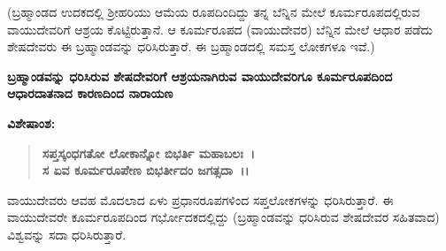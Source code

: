 (ಬ್ರಹ್ಮಾಂಡದ ಉದಕದಲ್ಲಿ ಶ‍್ರೀಹರಿಯು ಆಮೆಯ ರೂಪದಿಂದಿದ್ದು ತನ್ನ ಬೆನ್ನಿನ ಮೇಲೆ ಕೂರ್ಮರೂಪದಲ್ಲಿರುವ ವಾಯುದೇವರಿಗೆ ಆಶ್ರಯ ಕೊಟ್ಟಿರುತ್ತಾನೆ. ಆ ಕೂರ್ಮರೂಪದ (ವಾಯುದೇವರ) ಬೆನ್ನಿನ ಮೇಲೆ ಆಧಾರ ಪಡೆದು ಶೇಷದೇವರು ಈ ಬ್ರಹ್ಮಾಂಡವನ್ನು ಧರಿಸಿರುತ್ತಾರೆ. ಈ ಬ್ರಹ್ಮಾಂಡದಲ್ಲಿ ಸಮಸ್ತ ಲೋಕಗಳೂ ಇವೆ.)

\begin{center}
\textbf{ಬ್ರಹ್ಮಾಂಡವನ್ನು ಧರಿಸಿರುವ ಶೇಷದೇವರಿಗೆ ಆಶ್ರಯನಾಗಿರುವ ವಾಯುದೇವರಿಗೂ ಕೂರ್ಮರೂಪದಿಂದ ಆಧಾರದಾತನಾದ ಕಾರಣದಿಂದ ನಾರಾಯಣ}
\end{center}

\noindent
\textbf{ವಿಶೇಷಾಂಶ:\enginline{-}}

\begin{verse}
\textbf{ಸಪ್ತಸ್ಕಂಧಗತೋ ಲೋಕಾನ್ನೋ ಬಿಭರ್ತಿ ಮಹಾಬಲಃ~।}\\\textbf{ಸ ಏವ ಕೂರ್ಮರೂಪೇಣ ಬಿಭರ್ತೀದಂ ಜಗತ್ಸದಾ~।।}
\end{verse}


ವಾಯುದೇವರು ಆವಹ ಮೊದಲಾದ ಏಳು ಪ್ರಧಾನರೂಪಗಳಿಂದ ಸಪ್ತಲೋಕಗಳನ್ನು ಧರಿಸಿರುತ್ತಾರೆ. ಈ ವಾಯುದೇವರೇ ಕೂರ್ಮರೂಪದಿಂದ ಗರ್ಭೋದಕದಲ್ಲಿದ್ದು (ಬ್ರಹ್ಮಾಂಡವನ್ನು ಧರಿಸಿರುವ ಶೇಷದೇವರ ಸಹಿತವಾದ) ವಿಶ್ವವನ್ನು ಸದಾ ಧರಿಸಿರುತ್ತಾರೆ.

